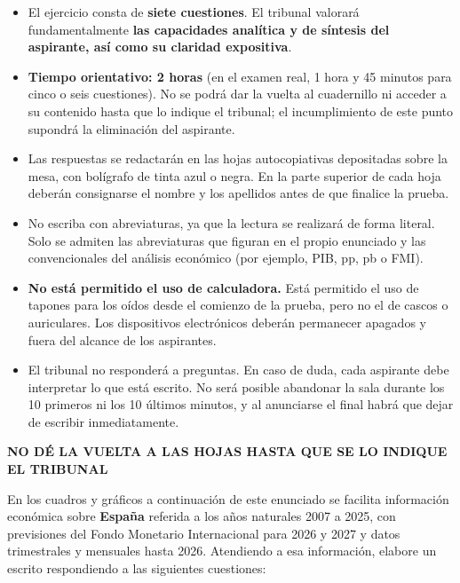 \documentclass[11pt,a4paper]{article}
\begin{document}
\begin{itemize}[leftmargin=1.2em, itemsep=2pt]
\item El ejercicio consta de \textbf{siete cuestiones}. El tribunal valorará fundamentalmente \textbf{las capacidades analítica y de síntesis del aspirante, así como su claridad expositiva}.
\item \textbf{Tiempo orientativo: 2 horas} (en el examen real, 1 hora y 45 minutos para cinco o seis cuestiones). No se podrá dar la vuelta al cuadernillo ni acceder a su contenido hasta que lo indique el tribunal; el incumplimiento de este punto supondrá la eliminación del aspirante.
\item Las respuestas se redactarán en las hojas autocopiativas depositadas sobre la mesa, con bolígrafo de tinta azul o negra. En la parte superior de cada hoja deberán consignarse el nombre y los apellidos antes de que finalice la prueba.
\item No escriba con abreviaturas, ya que la lectura se realizará de forma literal. Solo se admiten las abreviaturas que figuran en el propio enunciado y las convencionales del análisis económico (por ejemplo, PIB, pp, pb o FMI).
\item \textbf{No está permitido el uso de calculadora.} Está permitido el uso de tapones para los oídos desde el comienzo de la prueba, pero no el de cascos o auriculares. Los dispositivos electrónicos deberán permanecer apagados y fuera del alcance de los aspirantes.
\item El tribunal no responderá a preguntas. En caso de duda, cada aspirante debe interpretar lo que está escrito. No será posible abandonar la sala durante los 10 primeros ni los 10 últimos minutos, y al anunciarse el final habrá que dejar de escribir inmediatamente.
\end{itemize}

\vfill
\begin{center}
\textbf{NO DÉ LA VUELTA A LAS HOJAS HASTA QUE SE LO INDIQUE EL TRIBUNAL}
\end{center}

\clearpage
En los cuadros y gráficos a continuación de este enunciado se facilita información económica sobre \textbf{España} referida a los años naturales 2007 a 2025, con previsiones del Fondo Monetario Internacional para 2026 y 2027 y datos trimestrales y mensuales hasta 2026. Atendiendo a esa información, elabore un escrito respondiendo a las siguientes cuestiones:
\end{document}
